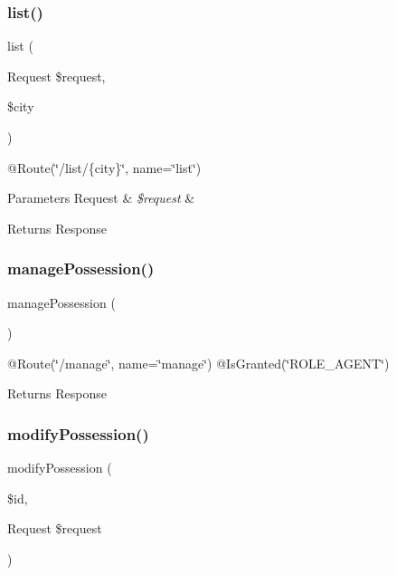 \subsubsection{\texorpdfstring{list()}{list()}}
{\footnotesize\ttfamily list (\begin{DoxyParamCaption}\item[{Request}]{\$request,  }\item[{}]{\$city }\end{DoxyParamCaption})}

@\+Route(\char`\"{}/list/\{city\}\char`\"{}, name=\char`\"{}list\char`\"{}) 
\begin{DoxyParams}[1]{Parameters}
Request & {\em \$request} & \\
\hline
\end{DoxyParams}
\begin{DoxyReturn}{Returns}
Response 
\end{DoxyReturn}
\mbox{\label{class_app_1_1_controller_1_1_possession_controller_a53e45f0b6b430ae57a986d97d83c8aa1}} 
\subsubsection{\texorpdfstring{managePossession()}{managePossession()}}
{\footnotesize\ttfamily manage\+Possession (\begin{DoxyParamCaption}{ }\end{DoxyParamCaption})}

@\+Route(\char`\"{}/manage\char`\"{}, name=\char`\"{}manage\char`\"{}) @\+Is\+Granted(\char`\"{}\+R\+O\+L\+E\+\_\+\+A\+G\+E\+N\+T\char`\"{}) \begin{DoxyReturn}{Returns}
Response 
\end{DoxyReturn}
\mbox{\label{class_app_1_1_controller_1_1_possession_controller_af77b741fb74001990f0e1f546bf464f0}} 
\subsubsection{\texorpdfstring{modifyPossession()}{modifyPossession()}}
{\footnotesize\ttfamily modify\+Possession (\begin{DoxyParamCaption}\item[{}]{\$id,  }\item[{Request}]{\$request }\end{DoxyParamCaption})}

